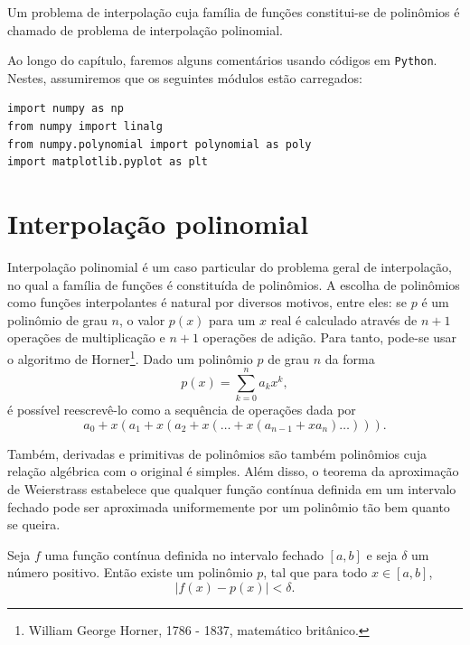 Um problema de interpolação cuja família de funções constitui-se de polinômios é chamado de problema de interpolação polinomial.

\ifispython
Ao longo do capítulo, faremos alguns comentários usando códigos em \verb+Python+. Nestes, assumiremos que os seguintes módulos estão carregados:
\begin{verbatim}
import numpy as np
from numpy import linalg
from numpy.polynomial import polynomial as poly
import matplotlib.pyplot as plt
\end{verbatim}
\fi


\section{Interpolação polinomial}

Interpolação polinomial é um caso particular do problema geral de interpolação, no qual a família de funções é constituída de polinômios. A escolha de polinômios como funções interpolantes é natural por diversos  motivos, entre eles: se $p$ é um polinômio de grau $n$, o valor $p(x)$ para um $x$ real é calculado através de $n+1$ operações de multiplicação e $n+1$ operações de adição. Para tanto, pode-se usar o algoritmo de Horner\footnote{William George Horner, 1786 - 1837, matemático britânico.}. Dado um polinômio $p$ de grau $n$ da forma
\begin{equation}
  p(x)=\sum_{k=0}^{n}a_k x^k,
\end{equation}
é possível reescrevê-lo como a sequência de operações dada por
\begin{equation}
  a_0 + x\left(a_1 + x\left(a_2 + x\left(\ldots + x\left(a_{n-1} + x a_n\right)\ldots\right)\right)\right).
\end{equation}

Também, derivadas e primitivas de polinômios são também polinômios cuja relação algébrica com o original é simples. Além disso, o teorema da aproximação de Weierstrass estabelece que qualquer função contínua definida em um intervalo fechado pode ser aproximada uniformemente por um polinômio tão bem quanto se queira.

\begin{teo}[Weierstrass]Seja $f$ uma função contínua definida no intervalo fechado $[a,b]$ e seja $\delta$ um número positivo. Então existe um polinômio $p$, tal que para todo $x\in[a,b]$,
  \begin{equation}
    |f(x)-p(x)|<\delta.
  \end{equation}
\end{teo}

